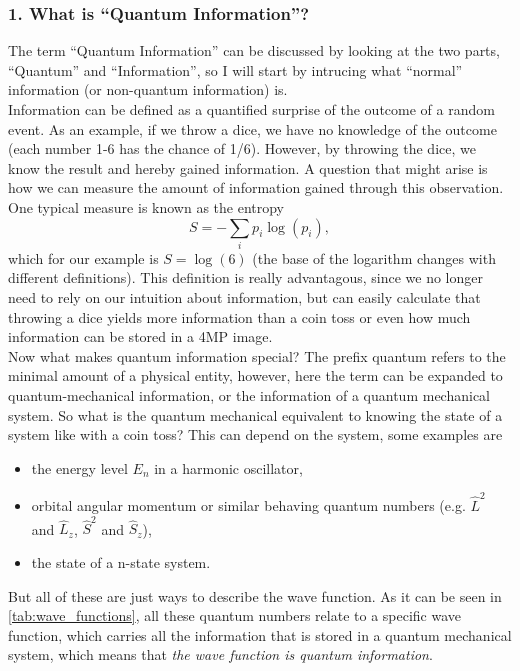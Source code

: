 \documentclass[english]{article}
\begin{document}
\thispagestyle{fancy}

\subsubsection*{1. What is “Quantum Information”?}

The term “Quantum Information” can be discussed by looking at the two parts, 
“Quantum” and “Information”, so I will start by intrucing what “normal” information 
(or non-quantum information) is. \\
Information can be defined as  a quantified surprise of the 
outcome of a random event. As an example, if we throw a dice, we have no knowledge of 
the outcome (each number 1-6 has the chance of 1/6). However, by throwing the dice, we 
know the result and hereby gained information. A question that might arise is how we 
can measure the amount of information gained through this observation. One typical measure 
is known as the entropy
\[
	S = -\sum_{i} p_i \log(p_i),
\]
which for our example is $S = \log(6)$ (the base of the logarithm changes with different
definitions). This definition is really advantagous, since we no longer need to rely on
our intuition about information, but can easily calculate that throwing a dice yields
more information than a coin toss or even how much information can be stored in a 4MP
image.
\\
Now what makes quantum information special? The prefix quantum refers to the minimal 
amount of a physical entity, however, here the term can be expanded to quantum-mechanical 
information, or the information of a quantum mechanical system. So what is the quantum
mechanical equivalent to knowing the state of a system like with a coin toss? This can
depend on the system, some examples are
\begin{itemize}
	\item the energy level $E_n$ in a harmonic oscillator,
	\item orbital angular momentum or similar behaving quantum numbers 
		(e.g. $\hat L^2$ and $\hat L_z$, $\hat S^2$ and $\hat S_z$),
	\item the state of a n-state system.
\end{itemize}
But all of these are just ways to describe the wave function. As it can be seen in
\autoref{tab:wave_functions}, all these quantum numbers relate to a specific wave function,
which carries all the
information that is stored in a quantum mechanical system, which means that \emph{the wave
function is quantum information}.
\end{document}
